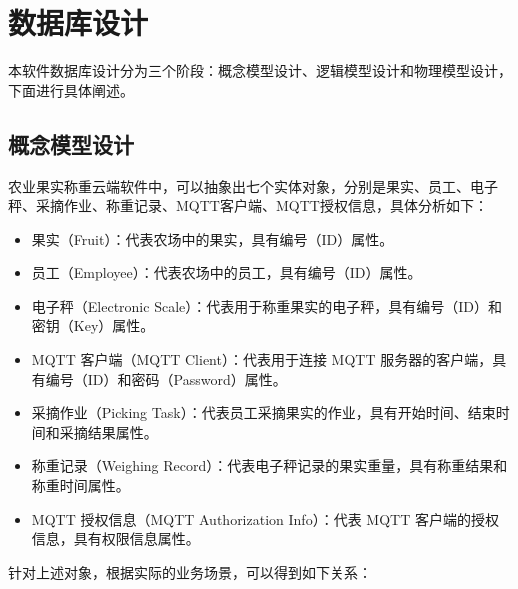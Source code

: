\section{数据库设计}

本软件数据库设计分为三个阶段：概念模型设计、逻辑模型设计和物理模型设计，下面进行具体阐述。

\subsection{概念模型设计}

农业果实称重云端软件中，可以抽象出七个实体对象，分别是果实、员工、电子秤、采摘作业、称重记录、MQTT客户端、MQTT授权信息，具体分析如下：

\begin{itemize}
    \item 果实（Fruit）：代表农场中的果实，具有编号（ID）属性。
    \item 员工（Employee）：代表农场中的员工，具有编号（ID）属性。
    \item 电子秤（Electronic Scale）：代表用于称重果实的电子秤，具有编号（ID）和密钥（Key）属性。
    \item MQTT 客户端（MQTT Client）：代表用于连接 MQTT 服务器的客户端，具有编号（ID）和密码（Password）属性。
    \item 采摘作业（Picking Task）：代表员工采摘果实的作业，具有开始时间、结束时间和采摘结果属性。
    \item 称重记录（Weighing Record）：代表电子秤记录的果实重量，具有称重结果和称重时间属性。
    \item MQTT 授权信息（MQTT Authorization Info）：代表 MQTT 客户端的授权信息，具有权限信息属性。
\end{itemize}

针对上述对象，根据实际的业务场景，可以得到如下关系：

